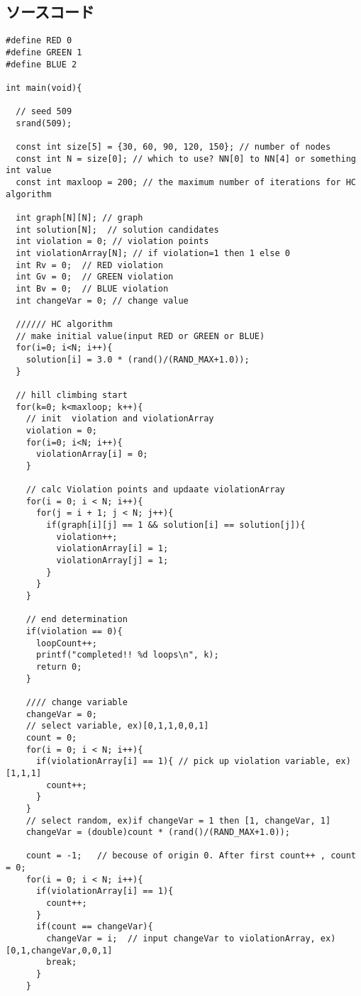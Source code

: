 \documentclass[a4j]{jarticle}
\begin{document}
\subsection*{ソースコード}
\begin{lstlisting}[caption=HC.c, label=HC.c, xleftmargin=1cm]
#define RED 0
#define GREEN 1
#define BLUE 2

int main(void){

  // seed 509
  srand(509);

  const int size[5] = {30, 60, 90, 120, 150}; // number of nodes
  const int N = size[0]; // which to use? NN[0] to NN[4] or something int value
  const int maxloop = 200; // the maximum number of iterations for HC algorithm

  int graph[N][N]; // graph
  int solution[N];  // solution candidates
  int violation = 0; // violation points
  int violationArray[N]; // if violation=1 then 1 else 0
  int Rv = 0;  // RED violation
  int Gv = 0;  // GREEN violation
  int Bv = 0;  // BLUE violation
  int changeVar = 0; // change value

  ////// HC algorithm
  // make initial value(input RED or GREEN or BLUE)
  for(i=0; i<N; i++){
    solution[i] = 3.0 * (rand()/(RAND_MAX+1.0));
  }
  
  // hill climbing start
  for(k=0; k<maxloop; k++){
    // init  violation and violationArray
    violation = 0;
    for(i=0; i<N; i++){
      violationArray[i] = 0;
    }

    // calc Violation points and updaate violationArray
    for(i = 0; i < N; i++){
      for(j = i + 1; j < N; j++){
        if(graph[i][j] == 1 && solution[i] == solution[j]){
          violation++;
          violationArray[i] = 1;
          violationArray[j] = 1;
        }        
      }
    }
    
    // end determination
    if(violation == 0){
      loopCount++;
      printf("completed!! %d loops\n", k);
      return 0;
    }
    
    //// change variable
    changeVar = 0;
    // select variable, ex)[0,1,1,0,0,1]
    count = 0;
    for(i = 0; i < N; i++){
      if(violationArray[i] == 1){ // pick up violation variable, ex)[1,1,1]
        count++;
      }
    }
    // select random, ex)if changeVar = 1 then [1, changeVar, 1] 
    changeVar = (double)count * (rand()/(RAND_MAX+1.0)); 

    count = -1;   // becouse of origin 0. After first count++ , count = 0;
    for(i = 0; i < N; i++){
      if(violationArray[i] == 1){
        count++;
      }
      if(count == changeVar){
        changeVar = i;  // input changeVar to violationArray, ex)[0,1,changeVar,0,0,1]
        break;
      }
    }
    

\end{lstlisting}
\end{document}
